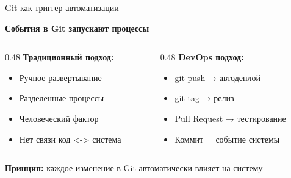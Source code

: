 \documentclass[aspectratio=169]{beamer}
\begin{document}
    \begin{frame}{Git как триггер автоматизации}
        \begin{center}
            \large
            \textbf{События в Git запускают процессы}
        \end{center}
        
        \vspace{0.5cm}
        
        \begin{columns}
            \begin{column}{0.48\textwidth}
                \textbf{Традиционный подход:}
                \begin{itemize}
                    \item Ручное развертывание
                    \item Разделенные процессы
                    \item Человеческий фактор
                    \item Нет связи код <-> система
                \end{itemize}
            \end{column}
            
            \begin{column}{0.48\textwidth}
                \textbf{DevOps подход:}
                \begin{itemize}
                    \item git push → автодеплой
                    \item git tag → релиз
                    \item Pull Request → тестирование
                    \item Коммит = событие системы
                \end{itemize}
            \end{column}
        \end{columns}
        
        \vspace{0.5cm}
        
        \textbf{Принцип:} каждое изменение в Git автоматически влияет на систему
    \end{frame}
\end{document}

